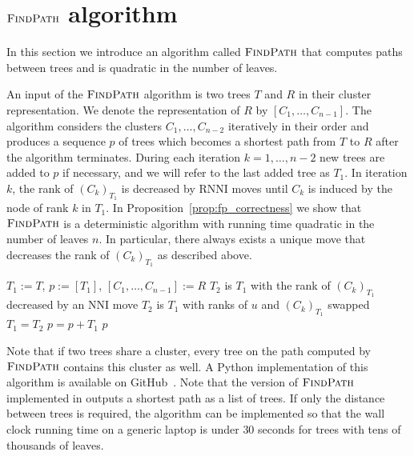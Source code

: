 \documentclass[11pt]{amsart}
\newcommand{\rnni}{\mathrm{RNNI}}
\newcommand{\findpath}{\textsc{FindPath}}
\newcommand{\rank}{\mathrm{rank}}
\newcommand{\nni}{\mathrm{NNI}}
\begin{document}
\section{$\findpath$ algorithm}
\label{sec:rnni_complexity}

In this section we introduce an algorithm called $\findpath$ that computes paths between trees and is quadratic in the number of leaves.

An input of the $\findpath$ algorithm is two trees $T$ and $R$ in their cluster representation.
We denote the representation of $R$ by $[C_1, \ldots, C_{n-1}]$.
The algorithm considers the clusters $C_1, \ldots, C_{n-2}$ iteratively in their order and produces a sequence $p$ of trees which becomes a shortest path from $T$ to $R$ after the algorithm terminates.
During each iteration $k = 1, \ldots, n-2$ new trees are added to $p$ if necessary, and we will refer to the last added tree as $T_1$.
In iteration $k$, the rank of $(C_{k})_{T_1}$ is decreased by $\rnni$ moves until $C_k$ is induced by the node of rank $k$ in $T_1$.
In Proposition~\ref{prop:fp_correctness} we show that $\findpath$ is a deterministic algorithm with running time quadratic in the number of leaves $n$.
In particular, there always exists a unique move that decreases the rank of $(C_{k})_{T_1}$ as described above.

\begin{algorithm}[H]
\caption{$\findpath$($T,R$)}
\begin{algorithmic}[1]
\STATE $T_1 := T$, $p := [T_1]$, $[C_1, \ldots, C_{n-1}] := R$
\label{alg:findpath:line:for_loop}
	\WHILE {$\rank((C_k)_{T_1})>k$}
	\label{alg:findpath:line:while_loop}
			\STATE $T_2$ is $T_1$ with the rank of $(C_k)_{T_1}$ decreased by an $\nni$ move
			\label{alg:nni_step}
		\ELSE
			\STATE $T_2$ is $T_1$ with ranks of $u$ and $(C_k)_{T_1}$ swapped
			\label{alg:rank_step}
		\ENDIF
		\STATE $T_1 = T_2$
		\STATE $p = p+T_1$
	\ENDWHILE
\ENDFOR
\RETURN $p$
\end{algorithmic}
\end{algorithm}

Note that if two trees share a cluster, every tree on the path computed by $\findpath$ contains this cluster as well.
A Python implementation of this algorithm is available on GitHub~\autocite{Collienne2019}.
Note that the version of $\findpath$ implemented in \autocite{Collienne2019} outputs a shortest path as a list of trees.
If only the distance between trees is required, the algorithm can be implemented so that the wall clock running time on a generic laptop is under $30$ seconds for trees with tens of thousands of leaves.
\end{document}
